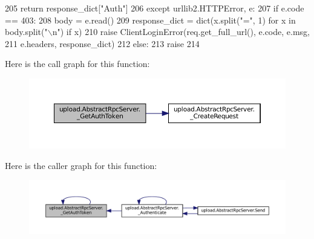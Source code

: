 \begin{DoxyCode}
205       \textcolor{keywordflow}{return} response\_dict[\textcolor{stringliteral}{"Auth"}]
206     \textcolor{keywordflow}{except} urllib2.HTTPError, e:
207       \textcolor{keywordflow}{if} e.code == 403:
208         body = e.read()
209         response\_dict = dict(x.split(\textcolor{stringliteral}{"="}, 1) \textcolor{keywordflow}{for} x \textcolor{keywordflow}{in} body.split(\textcolor{stringliteral}{"\(\backslash\)n"}) \textcolor{keywordflow}{if} x)
210         \textcolor{keywordflow}{raise} ClientLoginError(req.get\_full\_url(), e.code, e.msg,
211                                e.headers, response\_dict)
212       \textcolor{keywordflow}{else}:
213         \textcolor{keywordflow}{raise}
214 
\end{DoxyCode}
Here is the call graph for this function\+:
\nopagebreak
\begin{figure}[H]
\begin{center}
\leavevmode
\includegraphics[width=350pt]{classupload_1_1AbstractRpcServer_a5a801cc3fdbb8222fa58d41e098f70a7_cgraph}
\end{center}
\end{figure}
Here is the caller graph for this function\+:
\nopagebreak
\begin{figure}[H]
\begin{center}
\leavevmode
\includegraphics[width=350pt]{classupload_1_1AbstractRpcServer_a5a801cc3fdbb8222fa58d41e098f70a7_icgraph}
\end{center}
\end{figure}
\mbox{\label{classupload_1_1AbstractRpcServer_a388a9974eab1157ba4785e2ab2c33be9}} 
